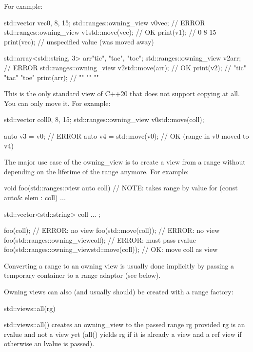 For example:

\begin{cpp}
std::vector vec{0, 8, 15};
std::ranges::owning_view v0{vec}; // ERROR
std::ranges::owning_view v1{std::move(vec)}; // OK
print(v1); // 0 8 15
print(vec); // unspecified value (was moved away)

std::array<std::string, 3> arr{"tic", "tac", "toe"};
std::ranges::owning_view v2{arr}; // ERROR
std::ranges::owning_view v2{std::move(arr)}; // OK
print(v2); // "tic" "tac" "toe"
print(arr); // "" "" ""
\end{cpp}

This is the only standard view of C++20 that does not support copying at all. You can only move it. For example:

\begin{cpp}
std::vector coll{0, 8, 15};
std::ranges::owning_view v0{std::move(coll)};

auto v3 = v0; // ERROR
auto v4 = std::move(v0); // OK (range in v0 moved to v4)
\end{cpp}

The major use case of the owning\_view is to create a view from a range without depending on the lifetime of the range anymore. For example:

\begin{cpp}
void foo(std::ranges::view auto coll) // NOTE: takes range by value
{
	for (const auto& elem : coll) {
		...
	}
}

std::vector<std::string> coll{ ... };

foo(coll); // ERROR: no view
foo(std::move(coll)); // ERROR: no view
foo(std::ranges::owning_view{coll}); // ERROR: must pass rvalue
foo(std::ranges::owning_view{std::move(coll)}); // OK: move coll as view
\end{cpp}

Converting a range to an owning view is usually done implicitly by passing a temporary container to a range adaptor (see below).


Owning views can also (and usually should) be created with a range factory:

\begin{cpp}
std::views::all(rg)
\end{cpp}

std::views::all() creates an owning\_view to the passed range rg provided rg is an rvalue and not a view yet (all() yields rg if it is already a view and a ref view if otherwise an lvalue is passed).


